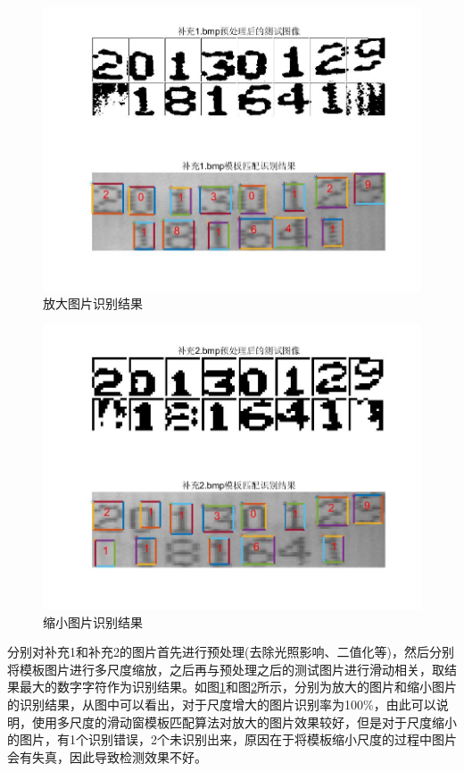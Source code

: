\documentclass[cn]{elegantbook}
\begin{document}
\begin{figure}[!h]
	\centering
	\includegraphics[width=\textwidth]{multi1}
	\caption{\label{buchong1}放大图片识别结果}
\end{figure}
\begin{figure}[!h]
	\centering
	\includegraphics[width=\textwidth]{multi2}
	\caption{\label{buchong2}缩小图片识别结果}
\end{figure}

分别对补充1和补充2的图片首先进行预处理(去除光照影响、二值化等)，然后分别将模板图片进行多尺度缩放，之后再与预处理之后的测试图片进行滑动相关，取结果最大的数字字符作为识别结果。如图\ref{buchong1}和图\ref{buchong2}所示，分别为放大的图片和缩小图片的识别结果，从图中可以看出，对于尺度增大的图片识别率为100\%，由此可以说明，使用多尺度的滑动窗模板匹配算法对放大的图片效果较好，但是对于尺度缩小的图片，有1个识别错误，2个未识别出来，原因在于将模板缩小尺度的过程中图片会有失真，因此导致检测效果不好。
\end{document}
